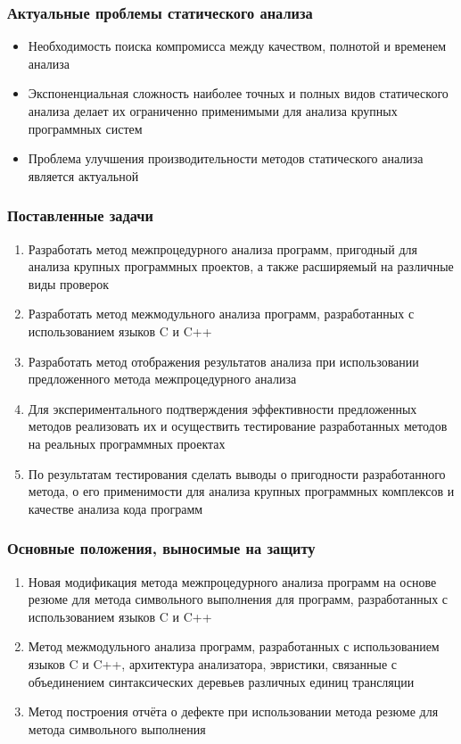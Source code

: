 \documentclass[14pt]{beamer}
\begin{document}
\begin{frame}
\frametitle{Актуальные проблемы статического анализа}
\begin{itemize}
  \item Необходимость поиска компромисса между качеством, полнотой и временем анализа
  \item Экспоненциальная сложность наиболее точных и полных видов статического анализа делает их ограниченно применимыми для анализа крупных программных систем
  \item Проблема улучшения производительности методов статического анализа является актуальной   
\end{itemize}
\end{frame}

\begin{frame}[allowframebreaks]
\frametitle{Поставленные задачи}
\begin{enumerate}
  \item Разработать метод межпроцедурного анализа программ, пригодный для анализа крупных программных проектов, а также расширяемый на различные виды проверок
  \item Разработать метод межмодульного анализа программ, разработанных с использованием языков C и C++
  \item Разработать метод отображения результатов анализа при использовании предложенного метода межпроцедурного анализа
  \item Для экспериментального подтверждения эффективности предложенных методов реализовать их и осуществить тестирование разработанных методов на реальных программных проектах
  \item По результатам тестирования сделать выводы о пригодности разработанного метода, о его применимости для анализа крупных программных комплексов и качестве анализа кода программ
\end{enumerate}
\end{frame}

\begin{frame}[allowframebreaks]
\frametitle{Основные положения, выносимые на защиту}
\begin{enumerate}
  \item Новая модификация метода межпроцедурного анализа программ на основе резюме для метода символьного выполнения для программ, разработанных с использованием языков C и C++
  \item Метод межмодульного анализа программ, разработанных с использованием языков C и C++, архитектура анализатора, эвристики, связанные с объединением синтаксических деревьев различных единиц трансляции
  \item Метод построения отчёта о дефекте при использовании метода резюме для метода символьного выполнения
\end{enumerate}
\end{frame}
\end{document}
